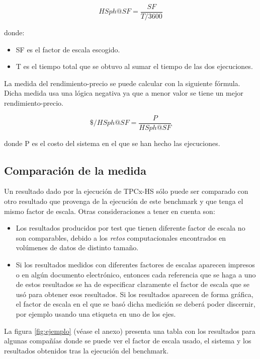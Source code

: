 \documentclass[10pt]{article}
\begin{document}
		$$ HSph@SF = \frac{SF}{T/3600} $$
		
		donde:
		\begin{itemize}
			\item SF es el factor de escala escogido.
			\item T es el tiempo total que se obtuvo al sumar el tiempo de las dos ejecuciones. \\
		\end{itemize}	
		
		La medida del rendimiento-precio se puede calcular con la siguiente fórmula. Dicha medida usa una lógica negativa ya que a menor valor se tiene un mejor rendimiento-precio.
		
		$$ \$/HSph@SF = \frac{P}{HSph@SF} $$
		
		donde P es el costo del sistema en el que se han hecho las ejecuciones.
		
		
		\subsection{Comparación de la medida}
		
		Un resultado dado por la ejecución de TPCx-HS sólo puede ser comparado con otro resultado que provenga de la ejecución de este benchmark y que tenga el mismo factor de escala. Otras consideraciones a tener en cuenta son:
		
		\begin{itemize}
			\item Los resultados producidos por test que tienen diferente factor de escala no son comparables, debido a los \textit{retos} computacionales encontrados en volúmenes de datos de distinto tamaño.
			\item Si los resultados medidos con diferentes factores de escalas aparecen impresos o en algún documento electrónico, entonces cada referencia que se haga a uno de estos resultados se ha de especificar claramente el factor de escala que se usó para obtener esos resultados. Si los resultados aparecen de forma gráfica, el factor de escala en el que se basó dicha medición se deberá poder discernir, por ejemplo usando una etiqueta en uno de los ejes.
		\end{itemize}
		
		
		La figura \ref{fig:ejemplo} (véase el anexo) presenta una tabla con los resultados para algunas compañías donde se puede ver el factor de escala usado, el sistema y los resultados obtenidos tras la ejecución del benchmark.

\end{document}
